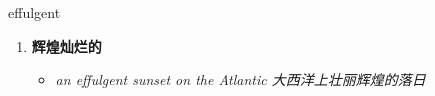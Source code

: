 
\begin{frame}
{\huge effulgent}
\begin{center}
\begin{enumerate}\Large
  \item \textbf{辉煌灿烂的}
  \begin{itemize}
    \item \em{\Large{an effulgent sunset on the Atlantic 大西洋上壮丽辉煌的落日}}
  \end{itemize}
\end{enumerate}
\end{center}
\end{frame}
